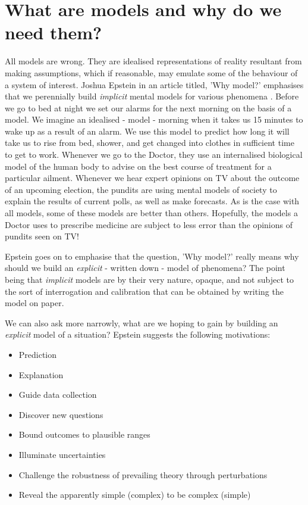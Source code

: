 \documentclass[11pt,fullpage]{book}
\begin{document}
\section{What are models and why do we need them?}
All models are wrong. They are idealised representations of reality resultant from making assumptions, which if reasonable, may emulate some of the behaviour of a system of interest. Joshua Epstein in an article titled, 'Why model?' emphasises that we perennially build \textit{implicit} mental models for various phenomena \cite{epstein2008model}. Before we go to bed at night we set our alarms for the next morning on the basis of a model. We imagine an idealised - model - morning when it takes us 15 minutes to wake up as a result of an alarm. We use this model to predict how long it will take us to rise from bed, shower, and get changed into clothes in sufficient time to get to work. Whenever we go to the Doctor, they use an internalised biological model of the human body to advise on the best course of treatment for a particular ailment. Whenever we hear expert opinions on TV about the outcome of an upcoming election, the pundits are using mental models of society to explain the results of current polls, as well as make forecasts. As is the case with all models, some of these models are better than others. Hopefully, the models a Doctor uses to prescribe medicine are subject to less error than the opinions of pundits seen on TV! 

Epstein goes on to emphasise that the question, 'Why model?' really means why should we build an \textit{explicit} - written down - model of phenomena? The point being that \textit{implicit} models are by their very nature, opaque, and not subject to the sort of interrogation and calibration that can be obtained by writing the model on paper. 

We can also ask more narrowly, what are we hoping to gain by building an \textit{explicit} model of a situation? Epstein suggests the following motivations:

\begin{itemize}
\item Prediction
\item Explanation
\item Guide data collection
\item Discover new questions
\item Bound outcomes to plausible ranges
\item Illuminate uncertainties
\item Challenge the robustness of prevailing theory through perturbations
\item Reveal the apparently simple (complex) to be complex (simple) 
\end{itemize}
\end{document}

